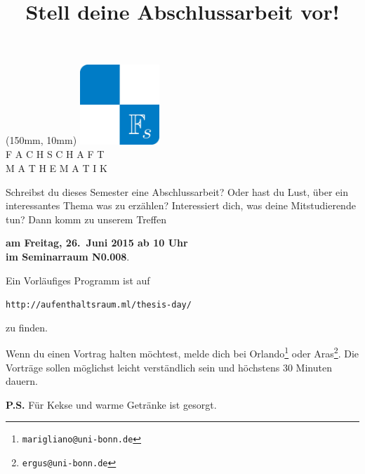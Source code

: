 \documentclass[23pt, a4paper, ngerman]{scrartcl}
\title{Stell deine Abschlussarbeit vor!}
\date{\vspace{-4cm}}
\begin{document}
\maketitle

\begin{textblock*}{50mm}(150mm, 10mm)
\includegraphics[width=30mm]{fs}\\
        \scriptsize
        F A C H S C H A F T\\
        M A T H E M A T I K
\end{textblock*}

Schreibst du dieses Semester eine Abschlussarbeit? Oder hast du Lust,
\"uber ein interessantes Thema was zu erz\"ahlen? Interessiert
dich, was deine Mitstudierende tun? Dann komm zu unserem Treffen
\begin{center}
\textbf{am Freitag, 26.\ Juni 2015 ab 10 Uhr \\ im Seminarraum N0.008}.
\end{center}

Ein Vorl\"aufiges Programm ist auf
\begin{center}
\texttt{http://aufenthaltsraum.ml/thesis-day/}
\end{center}
zu finden.

Wenn du einen Vortrag halten m\"ochtest, melde dich bei
Orlando\footnote{\texttt{marigliano@uni-bonn.de}} oder
Aras\footnote{\texttt{ergus@uni-bonn.de}}. Die Vortr\"age sollen m\"oglichst
leicht verst\"andlich sein und h\"ochstens 30 Minuten dauern.

\textbf{P.S.} F\"ur Kekse und warme Getr\"anke ist gesorgt.
\end{document}
